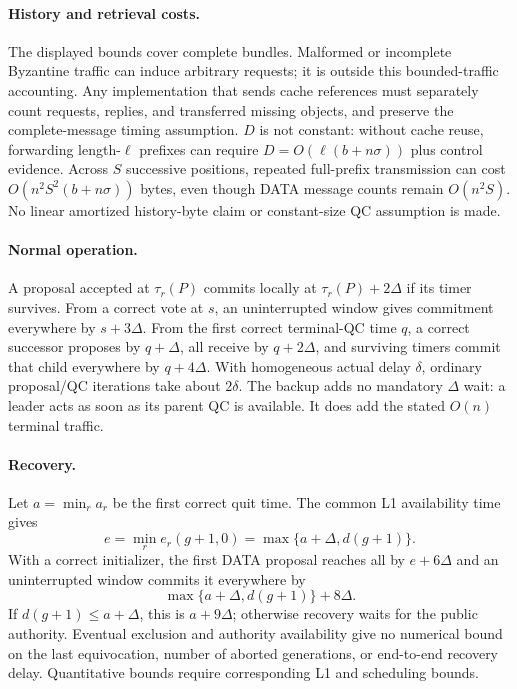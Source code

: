 \documentclass[11pt,a4paper]{article}
\begin{document}
\paragraph{History and retrieval costs.}
The displayed bounds cover complete bundles. Malformed or incomplete
Byzantine traffic can induce arbitrary requests; it is outside this
bounded-traffic accounting. Any implementation that sends cache references
must separately count requests, replies, and transferred missing objects,
and preserve the complete-message timing assumption. $D$ is not constant:
without cache reuse, forwarding length-$\ell$ prefixes can require
$D=O(\ell(b+n\sigma))$ plus control evidence. Across $S$ successive
positions, repeated full-prefix transmission can cost
$O(n^2S^2(b+n\sigma))$ bytes, even though DATA message counts remain
$O(n^2S)$. No linear amortized history-byte claim or constant-size QC
assumption is made.

\paragraph{Normal operation.}
A proposal accepted at $\tau_r(P)$ commits locally at
$\tau_r(P)+2\Delta$ if its timer survives. From a correct vote at $s$,
an uninterrupted window gives commitment everywhere by $s+3\Delta$.
From the first correct terminal-QC time $q$, a correct successor proposes
by $q+\Delta$, all receive by $q+2\Delta$, and surviving timers commit
that child everywhere by $q+4\Delta$. With homogeneous actual delay
$\delta$, ordinary proposal/QC iterations take about $2\delta$.
The backup adds no mandatory $\Delta$ wait: a leader acts as soon as
its parent QC is available. It does add the stated $O(n)$ terminal traffic.

\paragraph{Recovery.}
Let $a=\min_r a_r$ be the first correct quit time. The common L1
availability time gives
\[
 e=\min_r e_r(g+1,0)=\max\{a+\Delta,d(g+1)\}.
\]
With a correct initializer, the first DATA proposal reaches all by
$e+6\Delta$ and an uninterrupted window commits it everywhere by
\[
 \max\{a+\Delta,d(g+1)\}+8\Delta.
\]
If $d(g+1)\le a+\Delta$, this is $a+9\Delta$; otherwise recovery
waits for the public authority. Eventual exclusion and
authority availability give no numerical bound on the last equivocation,
number of aborted generations, or end-to-end recovery delay. Quantitative
bounds require corresponding L1 and scheduling bounds.
\end{document}
